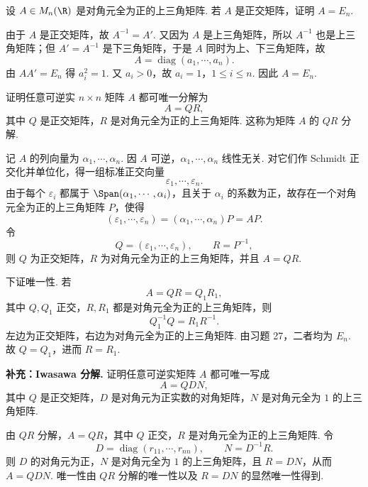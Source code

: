\begin{problem}
	设 $A\in M_n(\R)$ 是对角元全为正的上三角矩阵. 若 $A$ 是正交矩阵，证明 $A=E_n$.
\end{problem}
\begin{solution}
	由于 $A$ 是正交矩阵，故 $A^{-1}=A'$. 又因为 $A$ 是上三角矩阵，所以 $A^{-1}$ 也是上三角矩阵；但 $A'=A^{-1}$ 是下三角矩阵，于是 $A$ 同时为上、下三角矩阵，故
	\[
	A=\operatorname{diag}(a_1,\cdots,a_n).
	\]
	由 $AA'=E_n$ 得 $a_i^2=1$. 又 $a_i>0$，故 $a_i=1$，$1\leqslant i\leqslant n$. 因此 $A=E_n$.
\end{solution}

\begin{problem}
	证明任意可逆实 $n\times n$ 矩阵 $A$ 都可唯一分解为
	\[
	A=QR,
	\]
	\label{p1:concept:c6-l2744}其中 $Q$ 是正交矩阵，$R$ 是对角元全为正的上三角矩阵. 这称为矩阵 $A$ 的 $QR$ 分解.
\end{problem}
\begin{solution}
	记 $A$ 的列向量为 $\alpha_1,\cdots,\alpha_n$. 因 $A$ 可逆，$\alpha_1,\cdots,\alpha_n$ 线性无关. 对它们作 Schmidt 正交化并单位化，得一组标准正交向量
	\[
	\varepsilon_1,\cdots,\varepsilon_n.
	\]
	由于每个 $\varepsilon_i$ 都属于 $\Span(\alpha_1,\cdots,\alpha_i)$，且关于 $\alpha_i$ 的系数为正，故存在一个对角元全为正的上三角矩阵 $P$，使得
	\[
	(\varepsilon_1,\cdots,\varepsilon_n)=(\alpha_1,\cdots,\alpha_n)P=AP.
	\]
	令
	\[
	Q=(\varepsilon_1,\cdots,\varepsilon_n),
	\qquad R=P^{-1},
	\]
	则 $Q$ 为正交矩阵，$R$ 为对角元全为正的上三角矩阵，并且 $A=QR$.
	
	下证唯一性. 若
	\[
	A=QR=Q_1R_1,
	\]
	其中 $Q,Q_1$ 正交，$R,R_1$ 都是对角元全为正的上三角矩阵，则
	\[
	Q_1^{-1}Q=R_1R^{-1}.
	\]
	左边为正交矩阵，右边为对角元全为正的上三角矩阵. 由习题 27，二者均为 $E_n$. 故 $Q=Q_1$，进而 $R=R_1$.
\end{solution}

\begin{problem}
	\textbf{补充：Iwasawa 分解.}
	证明任意可逆实矩阵 $A$ 都可唯一写成
	\[
	A=QDN,
	\]
	其中 $Q$ 是正交矩阵，$D$ 是对角元为正实数的对角矩阵，$N$ 是对角元全为 $1$ 的上三角矩阵.
\end{problem}
\begin{solution}
	由 $QR$ 分解，$A=QR$，其中 $Q$ 正交，$R$ 是对角元全为正的上三角矩阵. 令
	\[
	D=\operatorname{diag}(r_{11},\cdots,r_{nn}),
	\qquad N=D^{-1}R.
	\]
	则 $D$ 的对角元为正，$N$ 是对角元全为 $1$ 的上三角矩阵，且 $R=DN$，从而 $A=QDN$.
	唯一性由 $QR$ 分解的唯一性以及 $R=DN$ 的显然唯一性得到.
\end{solution}

